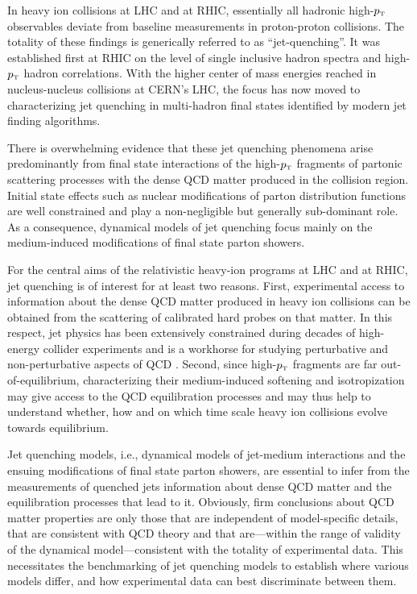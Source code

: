 In heavy ion collisions at LHC and at RHIC, essentially all hadronic high-$p_{\text{\tiny T}}$ observables deviate from baseline measurements in proton-proton collisions. The totality of these findings is generically referred to as ``jet-quenching''. It was established first at RHIC on the level of single inclusive hadron spectra and high-$p_{\text{\tiny T}}$ hadron correlations. With the higher center of mass energies reached in nucleus-nucleus collisions at CERN's LHC, the focus has now moved to characterizing jet quenching in multi-hadron final states identified by modern jet finding algorithms.

There is overwhelming evidence that these jet quenching phenomena arise predominantly from final state interactions of the high-$p_{\text{\tiny T}}$ fragments of partonic scattering processes with the dense QCD matter produced in the collision region. Initial state effects such as nuclear modifications of parton distribution functions are well constrained and play a non-negligible but generally sub-dominant role. As a consequence, dynamical models of jet quenching focus mainly on the medium-induced modifications of final state parton showers. 

For the central aims of the relativistic heavy-ion programs at LHC and at RHIC, jet quenching is of interest for at least two reasons. First, experimental access to information about the dense QCD matter produced in heavy ion collisions can be obtained from the scattering of calibrated hard probes on that matter. 
In this respect, jet physics has been extensively constrained during decades of high-energy collider experiments and is a workhorse for studying perturbative and non-perturbative aspects of QCD \cite{Ellis:1991qj}.
Second, since high-$p_{\text{\tiny T}}$ fragments are far out-of-equilibrium, characterizing their medium-induced softening and isotropization may give access to the QCD equilibration processes and may thus help to understand whether, how and on which time scale heavy ion collisions evolve towards equilibrium. 

Jet quenching models, i.e., dynamical models of jet-medium interactions and the ensuing modifications of final state parton showers, are essential to 
infer from the measurements of quenched jets information about dense QCD matter and the equilibration processes that lead to it. Obviously, firm 
conclusions about QCD matter properties are only those that are independent of model-specific details, that are consistent with QCD theory and that are---within the range of validity of the dynamical model---consistent with the totality of experimental data. This necessitates the benchmarking of jet quenching models to establish where various models differ, and how experimental data can best discriminate between them.

